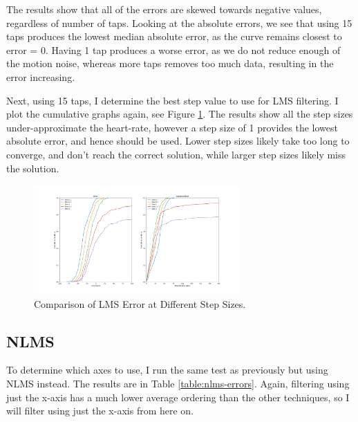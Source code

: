 \documentclass[12pt,a4paper,twoside,openright]{report}
\begin{document}
The results show that all of the errors are skewed towards negative values,
regardless of number of taps. Looking at the absolute errors, we see that
using 15 taps produces the lowest median absolute error, as the curve remains
closest to error = 0. Having 1 tap produces a worse error, as we do not reduce
enough of the motion noise, whereas more taps removes too much data, resulting
in the error increasing.

Next, using 15 taps, I determine the best step value to use for LMS filtering.
I plot the cumulative graphs again, see Figure \ref{fig:lms-medium-step}. The
results show all the step sizes under-approximate the heart-rate, however a
step size of 1 provides the lowest absolute error, and hence should be used.
Lower step sizes likely take too long to converge, and don't reach the correct
solution, while larger step sizes likely miss the solution.

\begin{figure}[tbh]
	\centerline{\includegraphics[width=0.7\textwidth]{figs/lms-steps-error-medium-noise.png}}
	\caption{Comparison of LMS Error at Different Step Sizes.}
	\label{fig:lms-medium-step}
\end{figure}


\subsection{NLMS}

To determine which axes to use, I run the same test as previously but using
NLMS instead. The results are in Table \ref{table:nlms-errors}. Again,
filtering using just the x-axis has a much lower average ordering than the
other techniques, so I will filter using just the x-axis from here on.
\end{document}
